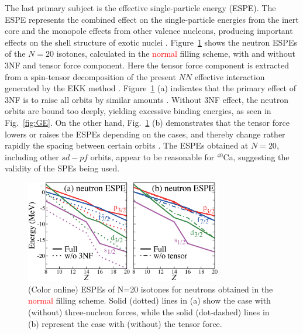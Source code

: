 \documentclass[aps,prl,twocolumn,groupedaddress,showkeys,showpacs,floatfix,superscriptaddress]{revtex4-1}
\newcommand\+{^\dagger}
\begin{document}
The last primary subject is the effective single-particle energy (ESPE). The ESPE represents
the combined effect on the single-particle energies from the inert core and the monopole effects 
from other valence nucleons, 
producing important effects on the shell structure of exotic nuclei 
\cite{PhysRevLett.95.232502,Otsuka:2009qs,PhysRevLett.105.032501,nobel_otsuka}.   
Figure~\ref{fig:ESPE} shows the neutron ESPEs of the
$N=20$ isotones, calculated in the 
\textcolor{red}{normal} 
filling scheme, with and without  3NF and tensor force component.
Here the tensor force component is extracted from a spin-tensor decomposition
of the present $NN$ effective interaction generated by the EKK method \cite{Tsunoda:2014hj}.
Figure~\ref{fig:ESPE} (a) indicates that the primary effect of 3NF is to raise all orbits by 
similar amounts \cite{PhysRevLett.105.032501}.  
Without 3NF effect, the neutron orbits are bound too deeply, yielding excessive binding energies,  
as seen in Fig.~\ref{fig:GE}.
On the other hand, 
Fig.~\ref{fig:ESPE} (b) demonstrates that the tensor force lowers or raises the ESPEs depending 
on the cases, and thereby 
change rather rapidly the spacing between certain orbits \cite{PhysRevLett.95.232502}.   
The ESPEs obtained at $N=20$, including other $sd-pf$ orbits, appear to be reasonable for $^{40}$Ca, 
suggesting the validity of the SPEs being used. 
 
 \begin{figure}[tbp]
  \includegraphics[width=8.5725cm,angle=0,clip]{Fig4.eps}
 \caption{(Color online) ESPEs of N=20 isotones for neutrons
  obtained in the \textcolor{red}{normal} filling scheme.
 Solid (dotted) lines in (a) show the case with (without) three-nucleon forces, while  the  
 solid (dot-dashed) lines in (b) represent the case with (without) the tensor force.}
 \label{fig:ESPE}
 \end{figure}
\end{document}
